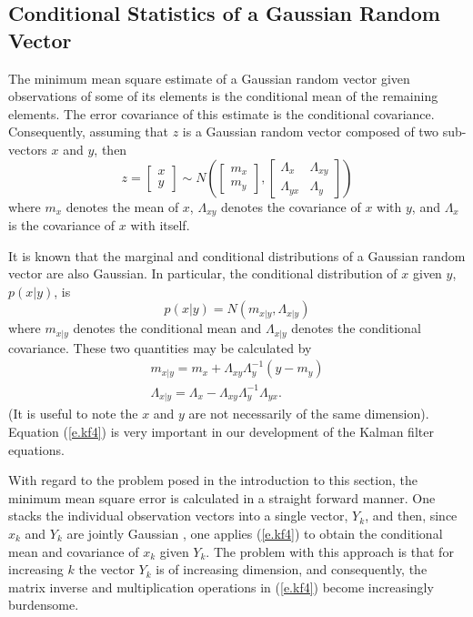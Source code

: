 \subsection{Conditional Statistics of a Gaussian Random Vector}

	The minimum mean square estimate of a
Gaussian random vector given observations of some of its
elements is the conditional mean of the remaining elements.
The error covariance of this estimate is the conditional covariance.
Consequently, assuming that $z$ is a Gaussian random vector 
composed of two sub-vectors $x$ and $y$, then
%
\begin{equation}
z=\left[\begin{array}{c}x\\y\end{array}\right]
\sim
  N\left(\left[\begin{array}{c}m_x\\m_y\end{array}\right],
  \left[\begin{array}{cc}\Lambda_{x}&\Lambda_{xy}\\
  \Lambda_{yx}&\Lambda_{y}\end{array}
   \right]\right)
\label{e.kf2}
\end{equation}
%
where $m_x$ denotes the mean of $x$, $\Lambda_{xy}$ denotes the 
covariance of $x$ with $y$, and $\Lambda_x$ is the covariance of $x$
with itself.

	It is known that the marginal and conditional distributions
of a Gaussian random vector are also Gaussian.  In particular,
the conditional distribution of $x$ given $y$, $p(x|y)$, is
%
\begin{equation}
p(x|y)=N(m_{x|y},\Lambda_{x|y})
\label{e.kf3}
\end{equation}
%
where $m_{x|y}$ denotes the conditional mean and $\Lambda_{x|y}$
denotes the conditional covariance.  These two quantities may be
calculated by
%
\begin{eqnarray}
m_{x|y}=m_x+\Lambda_{xy}\Lambda_y^{-1}(y-m_y)\nonumber\\
\Lambda_{x|y}=\Lambda_x-\Lambda_{xy}\Lambda_y^{-1}\Lambda_{yx}.
\label{e.kf4}
\end{eqnarray}
%
(It is useful to note the $x$ and $y$ are not necessarily of
the same dimension).  Equation (\ref{e.kf4}) is very important 
in our development of the Kalman filter equations.

	With regard to the problem posed in the introduction
to this section, the minimum mean square error is
calculated in a straight forward manner.  One stacks the
individual observation vectors into a single vector, $Y_k$, and then,
since $x_k$ and $Y_k$ are jointly Gaussian , one applies 
(\ref{e.kf4}) to obtain the conditional mean and covariance
of $x_k$ given $Y_k$.  The problem with this approach is that for 
increasing $k$ the vector $Y_k$ is of increasing dimension, and 
consequently, the matrix inverse and multiplication operations in 
(\ref{e.kf4}) become increasingly burdensome.

